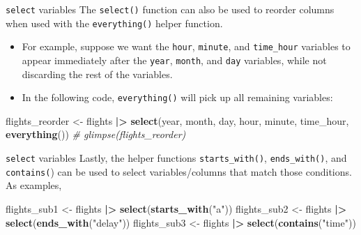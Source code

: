 \documentclass[
  ignorenonframetext,
]{beamer}
\newenvironment{Shaded}{\begin{snugshade}}{\end{snugshade}}
\newcommand{\CommentTok}[1]{\textcolor[rgb]{0.56,0.35,0.01}{\textit{#1}}}
\newcommand{\FunctionTok}[1]{\textcolor[rgb]{0.13,0.29,0.53}{\textbf{#1}}}
\newcommand{\NormalTok}[1]{#1}
\newcommand{\OtherTok}[1]{\textcolor[rgb]{0.56,0.35,0.01}{#1}}
\newcommand{\SpecialCharTok}[1]{\textcolor[rgb]{0.81,0.36,0.00}{\textbf{#1}}}
\newcommand{\StringTok}[1]{\textcolor[rgb]{0.31,0.60,0.02}{#1}}
\begin{document}
\begin{frame}[fragile]{\texttt{select} variables}
\label{select-variables-3}
The \texttt{select()} function can also be used to reorder columns when
used with the \texttt{everything()} helper function.

\begin{itemize}
\item
  For example, suppose we want the \texttt{hour}, \texttt{minute}, and
  \texttt{time\_hour} variables to appear immediately after the
  \texttt{year}, \texttt{month}, and \texttt{day} variables, while not
  discarding the rest of the variables.
\item
  In the following code, \texttt{everything()} will pick up all
  remaining variables:
\end{itemize}

\normalsize

\begin{Shaded}
\begin{Highlighting}[]
\NormalTok{flights\_reorder }\OtherTok{\textless{}{-}}\NormalTok{ flights }\SpecialCharTok{|\textgreater{}} 
  \FunctionTok{select}\NormalTok{(year, month, day, hour, minute, time\_hour, }
         \FunctionTok{everything}\NormalTok{())}
\CommentTok{\# glimpse(flights\_reorder)}
\end{Highlighting}
\end{Shaded}

\normalsize
\end{frame}

\begin{frame}[fragile]{\texttt{select} variables}
\label{select-variables-4}
Lastly, the helper functions \texttt{starts\_with()},
\texttt{ends\_with()}, and \texttt{contains(}) can be used to select
variables/columns that match those conditions. As examples,

\normalsize

\begin{Shaded}
\begin{Highlighting}[]
\NormalTok{flights\_sub1 }\OtherTok{\textless{}{-}}\NormalTok{ flights }\SpecialCharTok{|\textgreater{}} \FunctionTok{select}\NormalTok{(}\FunctionTok{starts\_with}\NormalTok{(}\StringTok{"a"}\NormalTok{))}
\NormalTok{flights\_sub2 }\OtherTok{\textless{}{-}}\NormalTok{ flights }\SpecialCharTok{|\textgreater{}} \FunctionTok{select}\NormalTok{(}\FunctionTok{ends\_with}\NormalTok{(}\StringTok{"delay"}\NormalTok{))}
\NormalTok{flights\_sub3 }\OtherTok{\textless{}{-}}\NormalTok{ flights }\SpecialCharTok{|\textgreater{}} \FunctionTok{select}\NormalTok{(}\FunctionTok{contains}\NormalTok{(}\StringTok{"time"}\NormalTok{))}
\end{Highlighting}
\end{Shaded}

\normalsize
\end{frame}
\end{document}
